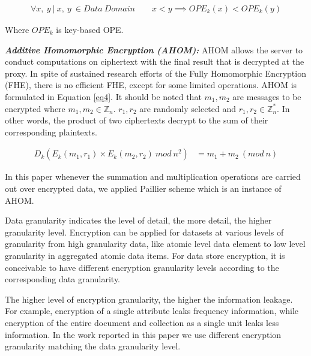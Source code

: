 \begin{equation} \label{eq3}
\begin{aligned}
\forall x, ~y ~|~ x,~y~ \in {Data~ Domain} \qquad x < y  \implies  OPE_k(x) < OPE_k(y)
\end{aligned}
\end{equation}

\normalsize Where $OPE_k$ is key-based OPE.


\medskip 

\noindent \textbf{\textit{Additive Homomorphic Encryption (AHOM):}} AHOM allows the server to conduct computations on ciphertext with the final result that is decrypted at the proxy. In spite of sustained research efforts \cite{gentry2009fully, brakerski2014efficient} of the Fully Homomorphic Encryption (FHE), there is no efficient FHE, except for some limited operations. AHOM is formulated in Equation \ref{eq4}. It should be noted that  $m_1, m_2$ are messages to be encrypted where $m_1 , m_2 \in \mathbb Z_{n}$. $r_1, r_2$ are randomly selected and $r_1, r_2 \in \mathbb Z^{*}_{n}$. In other words, the product of two ciphertexts decrypt to the sum of their corresponding plaintexts.

\begin{equation} \label{eq4}
\begin{aligned}
D_k(E_k(m_1, r_1) \times E_k(m_2, r_2) ~mod ~n^2) & = m_1 + m_2~ (mod~ n) 
\end{aligned}
\end{equation}

In this paper whenever the summation and multiplication operations are carried out over encrypted data, we applied Paillier \cite{paillier1999public} scheme which is an instance of AHOM.

Data granularity indicates the level of detail, the more detail, the higher granularity level.
Encryption can be applied for datasets at various levels of granularity from high granularity data, like atomic level data element to low level granularity in aggregated atomic data items. For data store encryption, it is conceivable to have different encryption granularity levels according to the corresponding data granularity. 

The higher level of encryption granularity, the higher the information leakage. For example, encryption of a single attribute leaks frequency information, while encryption of the entire  document and collection as a single unit leaks less information. In the work reported in this paper  we use different encryption granularity matching the data granularity level. 

